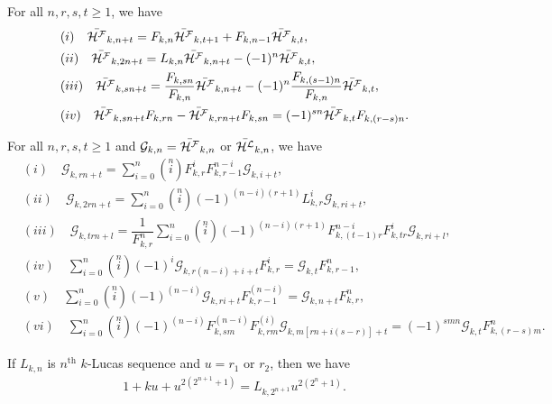 \begin{theorem}For all $n, r, s, t\geq 1$, we have\label{3.2t}
\begin{align*}
&(i)\quad\bar{{\mathcal{H^F}}}_{k,n+t}={F}_{k,n}\bar{{\mathcal{H^F}}}_{k,t+1}+{F}_{k,n-1}\bar{{\mathcal{H^F}}}_{k,t},\\
&(ii)\quad\bar{{\mathcal{H^F}}}_{k,2n+t}={L}_{k,n}\bar{{\mathcal{H^F}}}_{k,n+t}-(-1)^n\bar{{\mathcal{H^F}}}_{k,t},\\
&(iii)\quad\bar{{\mathcal{H^F}}}_{k,sn+t}=\dfrac{{F}_{k,sn}}{{F}_{k,n}}\bar{{\mathcal{H^F}}}_{k,n+t}-(-1)^n\dfrac{{F}_{k,(s-1)n}}{{F}_{k,n}}\bar{{\mathcal{H^F}}}_{k,t},\\ 
&(iv)\quad\bar{{\mathcal{H^F}}}_{k,sn+t}{F}_{k,rn}-\bar{{\mathcal{H^F}}}_{k,rn+t}{F}_{k,sn}=(-1)^{sn}\bar{{\mathcal{H^F}}}_{k,t}{F}_{k,(r-s)n}.
\end{align*}
\end{theorem}
\begin{theorem}For all $n, r, s, t\geq 1$ and $\mathcal{G}_{k,n}=\bar{{\mathcal{H^F}}}_{k,n}$ or $\bar{{\mathcal{H^L}}}_{k,n}$, we have\label{3.3t}
\begin{align*}
&(i)\quad\mathcal{G}_{k,rn+t}=\sum\limits_{i=0}^{n}\left( \stackrel{n}{i}\right) {F}_{k,r}^{i}{F}_{k,r-1}^{n-i}\mathcal{G}_{k,i+t},\\
&(ii)\quad\mathcal{G}_{k,2rn+t}=\sum\limits_{i=0}^{n}\left( \stackrel{n}{i}\right)(-1)^{(n-i)(r+1)}{L}_{k,r}^{i}\mathcal{G}_{k,ri+t},\\
&(iii)\quad\mathcal{G}_{k,trn+l}=\dfrac{1}{{F}_{k,r}^{n}}\sum\limits_{i=0}^{n}\left( \stackrel{n}{i}\right)(-1)^{(n-i)(r+1)} {F}_{k,(t-1)r}^{n-i}{F}_{k,tr}^{i}\mathcal{G}_{k,ri+l},\\
&(iv)\quad\sum\limits_{i=0}^{n}\left( \stackrel{n}{i}\right)(-1)^{i} \mathcal{G}_{k,r(n-i)+i+t}{F}_{k,r}^{i}=\mathcal{G}_{k,t}{F}_{k,r-1}^{n},\\
&(v)\quad\sum\limits_{i=0}^{n}\left( \stackrel{n}{i}\right)(-1)^{(n-i)} \mathcal{G}_{k,ri+t}{F}_{k,r-1}^{(n-i)}=\mathcal{G}_{k,n+t}{F}_{k,r}^{n} ,\\
&(vi)\quad\sum\limits_{i=0}^{n}\left( \stackrel{n}{i}\right)(-1)^{(n-i)}{F}_{k,sm}^{(n-i)}{F}_{k,rm}^{(i)} \mathcal{G}_{k,m[rn+i(s-r)]+t}=(-1)^{smn}\mathcal{G}_{k,t}{F}_{k,(r-s)m}^{n} .
\end{align*}
\end{theorem}
\begin{lemma}\label{3.4l}
If ${L}_{k,n}$ is $n^{\text{th}}$ $k$-Lucas sequence and $u=r_{1}$ or $r_{2}$, then we have
\begin{align*}
1+ku+u^{2(2^{n+1}+1)}={L}_{k,2^{n+1}}u^{2(2^{n}+1)}.
\end{align*}
\end{lemma}
